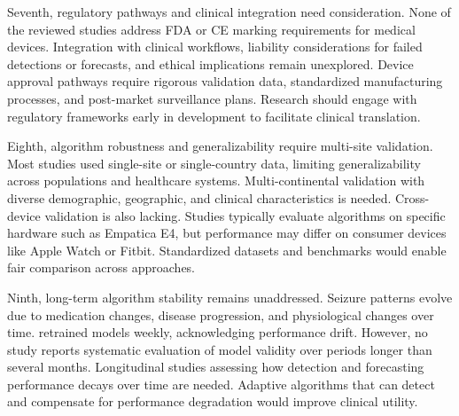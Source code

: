Seventh, regulatory pathways and clinical integration need consideration. None of the reviewed studies address FDA or CE marking requirements for medical devices. Integration with clinical workflows, liability considerations for failed detections or forecasts, and ethical implications remain unexplored. Device approval pathways require rigorous validation data, standardized manufacturing processes, and post-market surveillance plans. Research should engage with regulatory frameworks early in development to facilitate clinical translation.

Eighth, algorithm robustness and generalizability require multi-site validation. Most studies used single-site or single-country data, limiting generalizability across populations and healthcare systems. Multi-continental validation with diverse demographic, geographic, and clinical characteristics is needed. Cross-device validation is also lacking. Studies typically evaluate algorithms on specific hardware such as Empatica E4, but performance may differ on consumer devices like Apple Watch or Fitbit. Standardized datasets and benchmarks would enable fair comparison across approaches.

Ninth, long-term algorithm stability remains unaddressed. Seizure patterns evolve due to medication changes, disease progression, and physiological changes over time. \textcite{stirlingForecastingSeizureLikelihood2021} retrained models weekly, acknowledging performance drift. However, no study reports systematic evaluation of model validity over periods longer than several months. Longitudinal studies assessing how detection and forecasting performance decays over time are needed. Adaptive algorithms that can detect and compensate for performance degradation would improve clinical utility.

